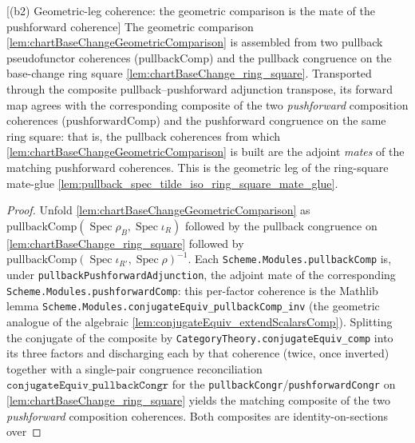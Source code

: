 \begin{lemma}

[(b2) Geometric-leg coherence: the geometric comparison is the mate of the pushforward coherence]
  \label{lem:chartBaseChangeGeometricComparison_mate}
  The geometric comparison \cref{lem:chartBaseChangeGeometricComparison} is assembled from two
  pullback pseudofunctor coherences (\(\mathrm{pullbackComp}\)) and the pullback congruence on the
  base-change ring square \cref{lem:chartBaseChange_ring_square}. Transported through the composite
  pullback--pushforward adjunction transpose, its forward map agrees with the corresponding composite
  of the two \emph{pushforward} composition coherences (\(\mathrm{pushforwardComp}\)) and the
  pushforward congruence on the same ring square: that is, the pullback coherences from which
  \cref{lem:chartBaseChangeGeometricComparison} is built are the adjoint \emph{mates} of the
  matching pushforward coherences. This is the geometric leg of the ring-square mate-glue
  \cref{lem:pullback_spec_tilde_iso_ring_square_mate_glue}.
  \begin{proof}
    Unfold \cref{lem:chartBaseChangeGeometricComparison} as
    \(\mathrm{pullbackComp}(\operatorname{Spec}\rho_B,\operatorname{Spec}\iota_R)\) followed by the
    pullback congruence on \cref{lem:chartBaseChange_ring_square} followed by
    \(\mathrm{pullbackComp}(\operatorname{Spec}\iota_{R'},\operatorname{Spec}\rho)^{-1}\). Each
    \texttt{Scheme.Modules.pullbackComp} is, under \texttt{pullbackPushforwardAdjunction}, the adjoint
    mate of the corresponding \texttt{Scheme.Modules.pushforwardComp}: this per-factor coherence is the
    Mathlib lemma \texttt{Scheme.Modules.conjugateEquiv\_pullbackComp\_inv} (the geometric analogue of
    the algebraic \cref{lem:conjugateEquiv_extendScalarsComp}). Splitting the conjugate of the composite
    by \texttt{CategoryTheory.conjugateEquiv\_comp} into its three factors and discharging each by that
    coherence (twice, once inverted) together with a single-pair congruence reconciliation
    \(\texttt{conjugateEquiv\_pullbackCongr}\) for the \texttt{pullbackCongr}/\texttt{pushforwardCongr}
    on \cref{lem:chartBaseChange_ring_square} yields the matching composite of the two
    \emph{pushforward} composition coherences. Both composites are identity-on-sections over

\end{proof}
\end{lemma}
